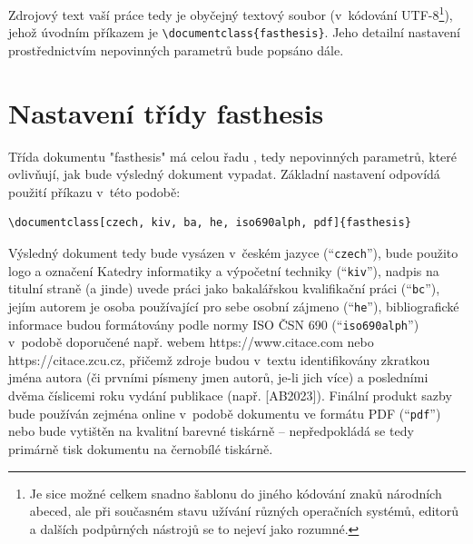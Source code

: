 \documentclass[czech, ma, kiv, he, iso690alph, pdf, viewonly]{fasthesis}
\begin{document}
Zdrojový text vaší práce tedy je obyčejný textový soubor (v~kódování UTF-8\footnote{Je sice možné celkem snadno šablonu  do jiného kódování znaků národních abeced, ale při současném stavu užívání různých operačních systémů, editorů a dalších podpůrných nástrojů se to nejeví jako rozumné.}), jehož úvodním příkazem je \verb"\documentclass{fasthesis}". Jeho detailní nastavení prostřednictvím nepovinných parametrů bude popsáno dále.
%
%
%
\section{Nastavení třídy {\ttzfamily fasthesis}}
Třída dokumentu \filename"fasthesis" má celou řadu , tedy nepovinných parametrů, které ovlivňují, jak bude výsledný dokument vypadat. Základní nastavení odpovídá použití příkazu v~této podobě:
\lstset{style=plainsrc, numbers=none}
\begin{lstlisting}
\documentclass[czech, kiv, ba, he, iso690alph, pdf]{fasthesis}
\end{lstlisting}
Výsledný dokument tedy bude vysázen v~českém jazyce (``\verb"czech"''), bude použito logo a označení Katedry informatiky a výpočetní techniky (``\verb"kiv"''), nadpis na titulní straně (a jinde) uvede práci jako bakalářskou kvalifikační práci (``\verb"bc"''), jejím autorem je osoba používající pro sebe osobní zájmeno  (``\verb"he"''), bibliografické informace budou formátovány podle
normy ISO ČSN 690 (``\verb"iso690alph"'') v~podobě doporučené např. webem {\ttzfamily\footnotesize https://www.citace.com} nebo {\ttzfamily\footnotesize https://citace.zcu.cz}, přičemž zdroje budou v~textu identifikovány zkratkou jména autora (či prvními písmeny jmen autorů, je-li jich více) a posledními dvěma číslicemi roku vydání publikace (např. [AB2023]).
Finální produkt sazby bude používán zejména online v~podobě dokumentu ve formátu PDF (``\verb"pdf"'') nebo bude vytištěn na kvalitní barevné tiskárně -- nepředpokládá se tedy primárně tisk dokumentu na černobílé tiskárně.
%
%
%
\end{document}
